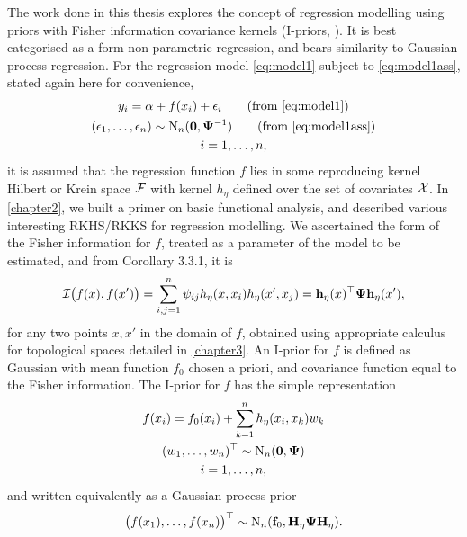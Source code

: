 \documentclass[a4paper,showframe,11pt]{report}
\begin{document}

The work done in this thesis explores the concept of regression modelling using priors with Fisher information covariance kernels (I-priors, \cite{bergsma2017}).
It is best categorised as a form non-parametric regression, and bears similarity to Gaussian process regression.
For the regression model \cref{eq:model1} subject to \cref{eq:model1ass}, stated again here for convenience,
\begin{gather}
  y_i = \alpha + f(x_i) + \epsilon_i \tag{from \ref{eq:model1}} \\
  (\epsilon_1,\dots,\epsilon_n) \sim \N_n(\bzero,\bPsi^{-1}) \tag{from \ref{eq:model1ass}} \\
  i = 1,\dots,n, \nonumber
\end{gather}
it is assumed that the regression function $f$ lies in some reproducing kernel Hilbert or Krein space ${\mathcal F}$ with kernel $h_\eta$ defined over the set of covariates ${\mathcal X}$.
In \cref{chapter2}, we built a primer on basic functional analysis, and described various interesting RKHS/RKKS for regression modelling.
We ascertained the form of the Fisher information for $f$, treated as a parameter of the model to be estimated, and from Corollary 3.3.1, it is
\begin{equation*}
  {\mathcal I}\big(f(x),f(x') \big) = \sum_{i,j=1}^n \psi_{ij} h_\eta(x,x_i) h_\eta(x',x_j) = {\mathbf h}_\eta(x)^\top{\bm\Psi}{\mathbf h}_\eta(x'), 
\end{equation*}
for any two points $x,x'$ in the domain of $f$, obtained using appropriate calculus for topological spaces detailed in \cref{chapter3}.
An I-prior for $f$ is defined as Gaussian with mean function $f_0$ chosen a priori, and covariance function equal to the Fisher information.
The I-prior for $f$ has the simple representation
\begin{gather*}
  f(x_i) = f_0(x_i) + \sum_{k=1}^n h_\eta(x_i,x_k)w_k \\
  (w_1,\dots,w_n)^\top \sim \operatorname{N}_n({\mathbf 0},{\bm\Psi}) \\
  i=1,\dots,n,
\end{gather*}
and written equivalently as a Gaussian process prior
\begin{equation*}
  \big(f(x_1),\dots,f(x_n) \big)^\top \sim \operatorname{N}_n({\mathbf f}_0, {\mathbf H}_\eta{\bm\Psi}{\mathbf H}_\eta).
\end{equation*}
\end{document}
